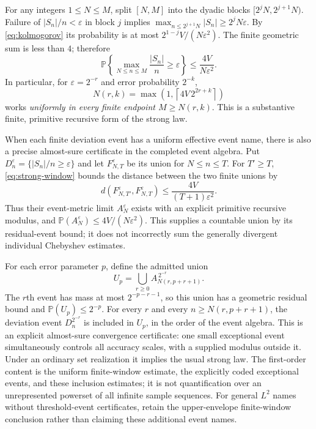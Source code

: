 For any integers $1\leq N\leq M$, split $[N,M]$ into the dyadic blocks
$[2^jN,2^{j+1}N)$.  Failure of $|S_n|/n<\varepsilon$ in block $j$ implies
$\max_{n\leq2^{j+1}N}|S_n|\geq2^jN\varepsilon$.  By
\eqref{eq:kolmogorov} its probability is at most
$2^{1-j}V/(N\varepsilon^2)$.  The finite geometric sum is less than $4$;
therefore
\begin{equation}
 \mathbb P\!\left\{\max_{N\leq n\leq M}\frac{|S_n|}{n}
                         \geq\varepsilon\right\}
 \leq\frac{4V}{N\varepsilon^2}.
 \label{eq:strong-window}
\end{equation}
In particular, for $\varepsilon=2^{-r}$ and error probability $2^{-k}$,
\begin{equation}
 N(r,k)=\max\!\left(1,\left\lceil4V\,2^{2r+k}\right\rceil\right)
 \label{eq:strong-modulus}
\end{equation}
works \emph{uniformly in every finite endpoint $M\geq N(r,k)$}.
This is a substantive finite, primitive recursive form of the strong law.

When each finite deviation event has a uniform effective event name,
there is also a precise almost-sure certificate in the completed event
algebra.  Put $D_n^\varepsilon=\{|S_n|/n\geq\varepsilon\}$ and let
$F_{N,T}^\varepsilon$ be its union for $N\leq n\leq T$.  For $T'\geq T$,
\eqref{eq:strong-window} bounds the distance between the two finite unions by
\[
 d(F_{N,T'}^\varepsilon,F_{N,T}^\varepsilon)
 \leq\frac{4V}{(T+1)\varepsilon^2}.
\]
Thus their event-metric limit $A_N^\varepsilon$ exists with an explicit
primitive recursive modulus, and
$\mathbb P(A_N^\varepsilon)\leq4V/(N\varepsilon^2)$.  This supplies a
countable union by its residual-event bound; it does not incorrectly sum
the generally divergent individual Chebyshev estimates.

For each error parameter $p$, define the admitted union
\[
 U_p=\bigcup_{r\geq0}A_{N(r,p+r+1)}^{\,2^{-r}}.
\]
The $r$th event has mass at most $2^{-p-r-1}$, so this union has a geometric
residual bound and $\mathbb P(U_p)\leq2^{-p}$.  For every $r$ and every
$n\geq N(r,p+r+1)$, the deviation event $D_n^{2^{-r}}$ is included in
$U_p$, in the order of the event algebra.  This is an explicit almost-sure
convergence certificate: one small exceptional event simultaneously
controls all accuracy scales, with a supplied modulus outside it.
Under an ordinary set realization it implies the usual strong law.
The first-order content is the uniform finite-window estimate, the
explicitly coded exceptional events, and these inclusion estimates; it is
not quantification over an unrepresented powerset of all infinite sample
sequences.  For general $L^2$ names without threshold-event certificates,
retain the upper-envelope finite-window conclusion rather than claiming
these additional event names.

